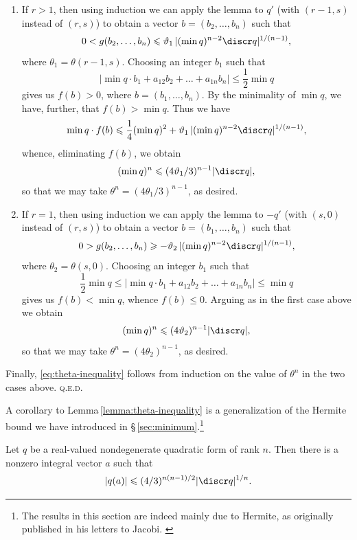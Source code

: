 \medskip

\begin{enumerate}[wide, nosep, label=(\roman*)]
    \item If \(r > 1\), then using induction we can apply the lemma to \(q'\)
    (with \((r-1, s)\) instead of \((r, s)\)) to obtain a vector \(b = (b_2,
    \dots, b_n)\) such that
    \[
        0 < g(b_2, \dots, b_n) \leq \theta_1\,|(\min q)^{n-2} \discr q|^{1/(n-1)},
    \]
    where \(\theta_1 = \theta(r-1, s)\). Choosing an integer \(b_1\) such that
    \[
        |\min q\cdot b_1 + a_{12} b_2 + \dots + a_{1n} b_n| \leq \frac{1}{2}\min q
    \]
    gives us \(f(b) > 0\), where \(b = (b_1, \dots, b_n)\). By the minimality of
    \(\min q\), we have, further, that \(f(b) > \min q\). Thus we have
    \[
        \min q \cdot f(b) \leq \frac{1}{4}(\min q)^2 + \theta_1\,|(\min q)^{n-2} \discr q|^{1/(n-1)},
    \]
    whence, eliminating \(f(b)\), we obtain
    \[
        (\min q)^n \leq (4\theta_1/3)^{n-1} |\discr q|,
    \]
    so that we may take \(\theta^n = (4\theta_1/3)^{n-1}\), as desired.

    \item If \(r = 1\), then using induction we can apply the lemma to \(-q'\)
    (with \((s,0)\) instead of \((r, s)\)) to obtain a vector \(b = (b_1, \dots,
    b_n)\) such that
    \[
        0 > g(b_2, \dots, b_n) \geq -\theta_2\,|(\min q)^{n-2} \discr q|^{1/(n-1)},
    \]
    where \(\theta_2 = \theta(s, 0)\). Choosing an integer \(b_1\) such that
    \[
        \frac{1}{2}\min q \leq |\min q\cdot b_1 + a_{12} b_2 + \dots + a_{1n} b_n| \leq \min q
    \]
    gives us \(f(b) < \min q\), whence \(f(b) \leq 0\). Arguing as in the first
    case above we obtain
    \[
        (\min q)^n \leq (4\theta_2)^{n-1} |\discr q|,
    \]
    so that we may take \(\theta^n = (4\theta_2)^{n-1}\), as desired.
\end{enumerate}

Finally, \eqref{eq:theta-inequality} follows from induction on the value of
\(\theta^n\) in the two cases above. {\scshape q.e.d.}

\medskip

A corollary to Lemma\,\ref{lemma:theta-inequality} is a generalization of the
Hermite bound we have introduced in \S\,\ref{sec:minimum}.\footnote{The results
in this section are indeed mainly due to Hermite, as originally published in his
letters to Jacobi. \cite{hermite1850extraits}}

\begin{corollary}
    Let \(q\) be a real-valued nondegenerate quadratic form of rank \(n\). Then
    there is a nonzero integral vector \(a\) such that
    \[
        |q(a)| \leq (4/3)^{n(n-1)/2} |\discr q|^{1/n}.
    \]
\end{corollary}

